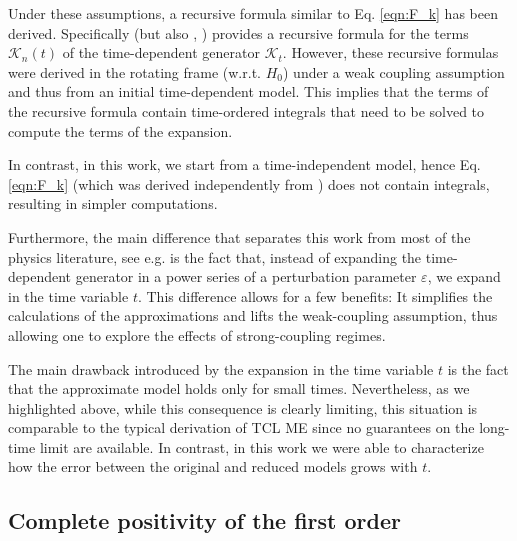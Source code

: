 \documentclass[twocolumn]{autart}    %
\newcommand{\Kc}{\mathcal{K}}
\begin{document}
Under these assumptions, a recursive formula similar to Eq. \eqref{eqn:F_k} has been derived.  
Specifically \cite[Eq. (38)]{nestmann2019time} (but also \cite[Eq. (2)]{cerrillo2014non} \cite[Eq. (2)]{cygorek2025timenonlocalversustimelocallongtime}, \cite[Eq. (16)]{gasbarri2018recursive}) provides a recursive formula for the terms $\Kc_n(t)$ of the time-dependent generator $\Kc_t$. However, these recursive formulas were derived in the rotating frame (w.r.t. $H_0$) under a weak coupling assumption and thus from an initial time-dependent model. This implies that the terms of the recursive formula contain time-ordered integrals that need to be solved to compute the terms of the expansion. 

In contrast, in this work, we start from a time-independent model, hence Eq. \eqref{eqn:F_k} (which was derived independently from \cite{nestmann2019time,cerrillo2014non,cygorek2025timenonlocalversustimelocallongtime,gasbarri2018recursive}) does not contain integrals, resulting in simpler computations.

Furthermore, the main difference that separates this work from most of the physics literature, see e.g. \cite{colla2025unveiling,colla2025recursive,Tokieda_2025} is the fact that, instead of expanding the time-dependent generator in a power series of a perturbation parameter $\varepsilon$, we expand in the time variable $t$. This difference allows for a few benefits: It simplifies the calculations of the approximations and lifts the weak-coupling assumption, thus allowing one to explore the effects of strong-coupling regimes. 

The main drawback introduced by the expansion in the time variable $t$ is the fact that the approximate model holds only for small times. Nevertheless, as we highlighted above, while this consequence is clearly limiting, this situation is comparable to the typical derivation of TCL ME since no guarantees on the long-time limit are available. In contrast, in this work we were able to characterize how the error between the original and reduced models grows with $t$.  

\subsection{Complete positivity of the first order}
\label{sec:cptp_first_order}
\end{document}
